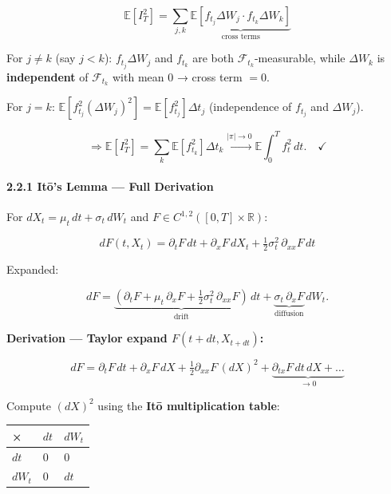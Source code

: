 \documentclass[11pt,a4paper]{article}
\begin{document}
\[\mathbb{E}[I_T^2] = \sum_{j,k}\underbrace{\mathbb{E}[f_{t_j}\Delta W_j \cdot f_{t_k}\Delta W_k]}_{\text{cross terms}}\]

For \(j \neq k\) (say \(j < k\)): \(f_{t_j}\Delta W_j\) and \(f_{t_k}\) are both \(\mathcal{F}_{t_k}\)-measurable, while \(\Delta W_k\) is \textbf{independent} of \(\mathcal{F}_{t_k}\) with mean 0 → cross term \(= 0\).

For \(j = k\): \(\mathbb{E}[f_{t_j}^2 (\Delta W_j)^2] = \mathbb{E}[f_{t_j}^2]\Delta t_j\) (independence of \(f_{t_j}\) and \(\Delta W_j\)).

\[\Rightarrow \mathbb{E}[I_T^2] = \sum_k \mathbb{E}[f_{t_k}^2]\Delta t_k \xrightarrow{|\pi|\to 0} \mathbb{E}\int_0^T f_t^2\,dt. \quad \checkmark\]

\paragraph{2.2.1 Itō's Lemma --- Full Derivation}\label{itux14ds-lemma-full-derivation}

\begin{tcolorbox}[colback=thmbg!60,colframe=optgold,fonttitle=\bfseries\sffamily,title={\textsf{\textbf{Theorem / Key Idea}} — Theorem — Itō's Lemma},breakable]
For $dX_t = \mu_t\,dt + \sigma_t\,dW_t$ and $F \in C^{1,2}([0,T]\times\mathbb{R})$:

$$\boxed{dF(t,X_t) = \partial_t F\,dt + \partial_x F\,dX_t + \tfrac{1}{2}\sigma_t^2\,\partial_{xx}F\,dt}$$

Expanded:

$$dF = \underbrace{\left(\partial_t F + \mu_t\,\partial_x F + \tfrac12\sigma_t^2\,\partial_{xx}F\right)}_{\text{drift}}\,dt
+ \underbrace{\sigma_t\,\partial_x F}_{\text{diffusion}}\,dW_t.$$
\end{tcolorbox}

\textbf{Derivation --- Taylor expand \(F(t+dt, X_{t+dt})\):}

\[dF = \partial_t F\,dt + \partial_x F\,dX + \tfrac12\partial_{xx}F\,(dX)^2 + \underbrace{\partial_{tx}F\,dt\,dX + \ldots}_{\to 0} \]

Compute \((dX)^2\) using the \textbf{Itō multiplication table}:

{\def\LTcaptype{none} %
\begin{longtable}[]{@{}lll@{}}
\toprule\noalign{}
× & \(dt\) & \(dW_t\) \\
\midrule\noalign{}
\endhead
\bottomrule\noalign{}
\endlastfoot
\(dt\) & \(0\) & \(0\) \\
\(dW_t\) & \(0\) & \(dt\) \\
\end{longtable}
}
\end{document}
